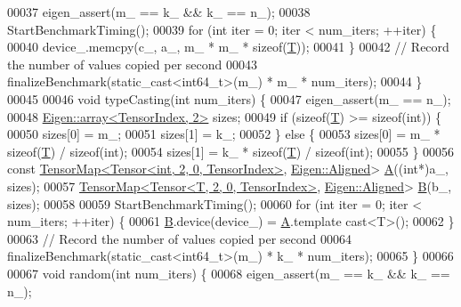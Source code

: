 \begin{DoxyCode}
00037     eigen\_assert(m\_ == k\_ && k\_ == n\_);
00038     StartBenchmarkTiming();
00039     \textcolor{keywordflow}{for} (\textcolor{keywordtype}{int} iter = 0; iter < num\_iters; ++iter) \{
00040       device\_.memcpy(c\_, a\_, m\_ * m\_ * \textcolor{keyword}{sizeof}(\hyperlink{group___sparse_core___module}{T}));
00041     \}
00042     \textcolor{comment}{// Record the number of values copied per second}
00043     finalizeBenchmark(static\_cast<int64\_t>(m\_) * m\_ * num\_iters);
00044   \}
00045 
00046   \textcolor{keywordtype}{void} typeCasting(\textcolor{keywordtype}{int} num\_iters) \{
00047     eigen\_assert(m\_ == n\_);
00048     \hyperlink{class_eigen_1_1array}{Eigen::array<TensorIndex, 2>} sizes;
00049     \textcolor{keywordflow}{if} (\textcolor{keyword}{sizeof}(\hyperlink{group___sparse_core___module}{T}) >= \textcolor{keyword}{sizeof}(\textcolor{keywordtype}{int})) \{
00050       sizes[0] = m\_;
00051       sizes[1] = k\_;
00052     \} \textcolor{keywordflow}{else} \{
00053       sizes[0] = m\_ * \textcolor{keyword}{sizeof}(\hyperlink{group___sparse_core___module}{T}) / \textcolor{keyword}{sizeof}(\textcolor{keywordtype}{int});
00054       sizes[1] = k\_ * \textcolor{keyword}{sizeof}(\hyperlink{group___sparse_core___module}{T}) / \textcolor{keyword}{sizeof}(\textcolor{keywordtype}{int});
00055     \}
00056     \textcolor{keyword}{const} \hyperlink{class_eigen_1_1_tensor_map}{TensorMap<Tensor<int, 2, 0, TensorIndex>}, 
      \hyperlink{group__enums_gga45fe06e29902b7a2773de05ba27b47a1ad37d4c71425bb286e9b4103830538fbf}{Eigen::Aligned}> \hyperlink{group___core___module_class_eigen_1_1_matrix}{A}((\textcolor{keywordtype}{int}*)a\_, sizes);
00057     \hyperlink{class_eigen_1_1_tensor_map}{TensorMap<Tensor<T, 2, 0, TensorIndex>}, 
      \hyperlink{group__enums_gga45fe06e29902b7a2773de05ba27b47a1ad37d4c71425bb286e9b4103830538fbf}{Eigen::Aligned}> \hyperlink{group___core___module_class_eigen_1_1_matrix}{B}(b\_, sizes);
00058 
00059     StartBenchmarkTiming();
00060     \textcolor{keywordflow}{for} (\textcolor{keywordtype}{int} iter = 0; iter < num\_iters; ++iter) \{
00061       \hyperlink{group___core___module_class_eigen_1_1_matrix}{B}.device(device\_) = \hyperlink{group___core___module_class_eigen_1_1_matrix}{A}.template cast<T>();
00062     \}
00063     \textcolor{comment}{// Record the number of values copied per second}
00064     finalizeBenchmark(static\_cast<int64\_t>(m\_) * k\_ * num\_iters);
00065   \}
00066 
00067   \textcolor{keywordtype}{void} random(\textcolor{keywordtype}{int} num\_iters) \{
00068     eigen\_assert(m\_ == k\_ && k\_ == n\_);

\end{DoxyCode}
